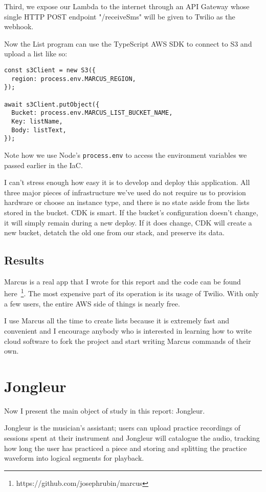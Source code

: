 \documentclass{article}
\begin{document}
Third, we expose our Lambda to the internet through an API Gateway whose single HTTP POST endpoint "/receiveSms" will be given to Twilio as the webhook.

Now the List program can use the TypeScript AWS SDK to connect to S3 and upload a list like so:

\begin{verbatim}
const s3Client = new S3({
  region: process.env.MARCUS_REGION,
});

await s3Client.putObject({
  Bucket: process.env.MARCUS_LIST_BUCKET_NAME,
  Key: listName,
  Body: listText,
});
\end{verbatim}

Note how we use Node's \texttt{process.env} to access the environment variables we passed earlier in the IaC.

I can't stress enough how easy it is to develop and deploy this application.
All three major pieces of infrastructure we've used do not require us to provision hardware or choose an instance type, and there is no state aside from the lists stored in the bucket.
CDK is smart.
If the bucket's configuration doesn't change, it will simply remain during a new deploy.
If it does change, CDK will create a new bucket, detatch the old one from our stack, and preserve its data.

\subsection{Results}

Marcus is a real app that I wrote for this report and the code can be found here~\footnote{https://github.com/josephrubin/marcus}.
The most expensive part of its operation is its usage of Twilio.
With only a few users, the entire AWS side of things is nearly free.

I use Marcus all the time to create lists because it is extremely fast and convenient and I encourage anybody who is interested in learning how to write cloud software to fork the project and start writing Marcus commands of their own.

\section{Jongleur}

Now I present the main object of study in this report: Jongleur.

Jongleur is the musician's assistant; users can upload practice recordings of sessions spent at their instrument and Jongleur will catalogue the audio, tracking how long the user has practiced a piece and storing and splitting the practice waveform into logical segments for playback.
\end{document}
